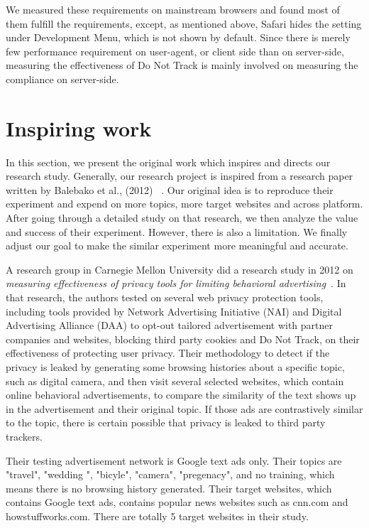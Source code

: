 \documentclass{sig-alternate}
\begin{document}
We measured these requirements on mainstream browsers and found most of them fulfill the requirements, except, as mentioned above, Safari hides the setting under Development Menu, which is not shown by default. Since there is merely few performance requirement on user-agent, or client side than on server-side, measuring the effectiveness of Do Not Track is mainly involved on measuring the compliance on server-side. 


\section{Inspiring work} \label{sec:lorrie}

In this section, we present the original work which inspires and directs our research study. Generally, our research project is inspired from a research paper written by Balebako et al., (2012) ~\cite{balebako2012measuring}. Our original idea is to reproduce their experiment and expend on more topics, more target websites and across platform. After going through a detailed study on that research, we then analyze the value and success of their experiment. However, there is also a limitation. We finally adjust our goal to make the similar experiment more meaningful and accurate.

A research group in Carnegie Mellon University did a research study in 2012 on \emph{measuring effectiveness of privacy tools for limiting behavioral advertising}~\cite{balebako2012measuring}. In that research, the authors tested on several web privacy protection tools, including tools provided by Network Advertising Initiative (NAI) and Digital Advertising Alliance (DAA) to opt-out tailored advertisement with partner companies and websites, blocking third party cookies and Do Not Track, on their effectiveness of protecting user privacy. Their methodology to detect if the privacy is leaked by generating some browsing histories about a specific topic, such as digital camera, and then visit several selected websites, which contain online behavioral advertisements, to compare the similarity of the text shows up in the advertisement and their original topic. If those ads are contrastively similar to the topic, there is certain possible that privacy is leaked to third party trackers.

Their testing advertisement network is Google text ads only. Their topics are "travel", "wedding ", "bicyle", "camera", "pregenacy", and no training, which means there is no browsing history generated. Their target websites, which contains Google text ads, contains popular news websites such as cnn.com and howstuffworks.com. There are totally 5 target websites in their study.
\end{document}
